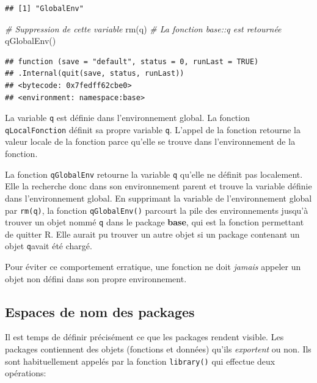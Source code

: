 \documentclass[
  11pt,
  french,
  a4paper,
  extrafontsizes,onecolumn,openright
  ]{memoir}
\newenvironment{Shaded}{\begin{snugshade}}{\end{snugshade}}
\newcommand{\CommentTok}[1]{\textcolor[rgb]{0.56,0.35,0.01}{\textit{#1}}}
\newcommand{\FunctionTok}[1]{\textcolor[rgb]{0.00,0.00,0.00}{#1}}
\newcommand{\NormalTok}[1]{#1}
\begin{document}
\begin{verbatim}
## [1] "GlobalEnv"
\end{verbatim}

\begin{Shaded}
\begin{Highlighting}[]
\CommentTok{\# Suppression de cette variable}
\FunctionTok{rm}\NormalTok{(q)}
\CommentTok{\# La fonction base::q est retournée}
\FunctionTok{qGlobalEnv}\NormalTok{()}
\end{Highlighting}
\end{Shaded}

\begin{verbatim}
## function (save = "default", status = 0, runLast = TRUE) 
## .Internal(quit(save, status, runLast))
## <bytecode: 0x7fedff62cbe0>
## <environment: namespace:base>
\end{verbatim}

\normalsize

La variable \texttt{q} est définie dans l'environnement global.
La fonction \texttt{qLocalFonction} définit sa propre variable \texttt{q}.
L'appel de la fonction retourne la valeur locale de la fonction parce qu'elle se trouve dans l'environnement de la fonction.

La fonction \texttt{qGlobalEnv} retourne la variable \texttt{q} qu'elle ne définit pas localement.
Elle la recherche donc dans son environnement parent et trouve la variable définie dans l'environnement global.
En supprimant la variable de l'environnement global par \texttt{rm(q)}, la fonction \texttt{qGlobalEnv()} parcourt la pile des environnements jusqu'à trouver un objet nommé \texttt{q} dans le package \textbf{base}, qui est la fonction permettant de quitter R.
Elle aurait pu trouver un autre objet si un package contenant un objet \texttt{q}avait été chargé.

Pour éviter ce comportement erratique, une fonction ne doit \emph{jamais} appeler un objet non défini dans son propre environnement.

\hypertarget{espaces-de-nom-des-packages}{%
\subsection{Espaces de nom des packages}\label{espaces-de-nom-des-packages}}

Il est temps de définir précisément ce que les packages rendent visible.
Les packages contiennent des objets (fonctions et données) qu'ils \emph{exportent} ou non.
Ils sont habituellement appelés par la fonction \texttt{library()} qui effectue deux opérations:
\end{document}
